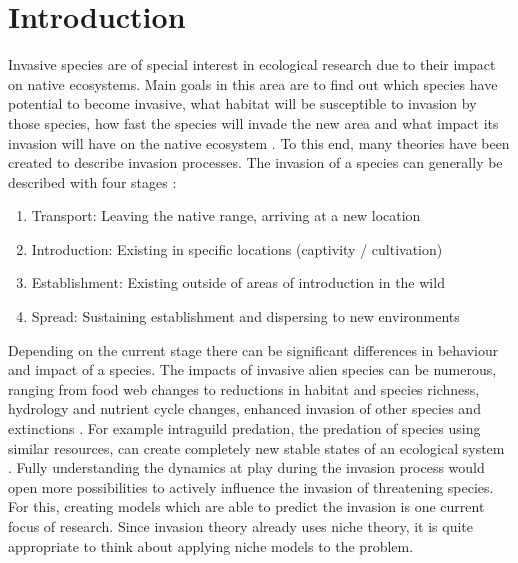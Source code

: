 \documentclass[12pt,a4paper]{article}
\begin{document}
\section{Introduction} \label{sec:introduction}
Invasive species are of special interest in ecological research due to their impact on native ecosystems.
Main goals in this area are to find out which species have potential to become invasive, what habitat will be susceptible to invasion by those species, how fast the species will invade the new area and what impact its invasion will have on the native ecosystem \autocite{shigesada1997invasions}.
To this end, many theories have been created to describe invasion processes.
The invasion of a species can  generally be described with four stages \autocite{blackburn2011invasionstages}:
\begin{enumerate}
    \item Transport: Leaving the native range, arriving at a new location
    \item Introduction: Existing in specific locations (captivity / cultivation)
    \item Establishment: Existing outside of areas of introduction in the wild
    \item Spread: Sustaining establishment and dispersing to new environments
\end{enumerate}
Depending on the current stage there can be significant differences in behaviour and impact of a species.
The impacts of invasive alien species can be numerous, ranging from food web changes to reductions in habitat and species richness, hydrology and nutrient cycle changes, enhanced invasion of other species and extinctions \autocite{simberloff2013invasiveimpacts}.
For example intraguild predation, the predation of species using similar resources, can create completely new stable states of an ecological system \autocite{polis1989theoryIGP}.
Fully understanding the dynamics at play during the invasion process would open more possibilities to actively influence the invasion of threatening species.
For this, creating models which are able to predict the invasion is one current focus of research.
Since invasion theory already uses niche theory, it is quite appropriate to think about applying niche models to the problem.
\end{document}
